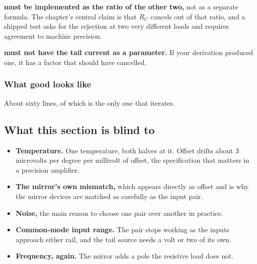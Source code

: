 \textbf{ must be implemented as the ratio of the other two,} not as a separate formula. The chapter's central claim is that $R_C$ cancels out of that ratio, and a shipped test asks for the rejection at two very different loads and requires agreement to machine precision.

\textbf{ must not have the tail current as a parameter.} If your derivation produced one, it has a factor that should have cancelled.

\subsubsection{What good looks like}
About sixty lines, of which  is the only one that iterates.

\subsection{What this section is blind to}
\label{c9:sec:b8}
\begin{itemize}
  \item \textbf{Temperature.} One temperature, both halves at it. Offset drifts about 3 microvolts per degree per millivolt of offset, the specification that matters in a precision amplifier.
  \item \textbf{The mirror's own mismatch,} which appears directly as offset and is why the mirror devices are matched as carefully as the input pair.
  \item \textbf{Noise,} the main reason to choose one pair over another in practice.
  \item \textbf{Common-mode input range.} The pair stops working as the inputs approach either rail, and the tail source needs a volt or two of its own.
  \item \textbf{Frequency, again.} The mirror adds a pole the resistive load does not.
\end{itemize}
